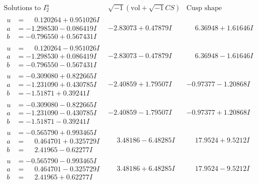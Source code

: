 \documentclass[1p]{elsarticle_modified}
\theoremstyle{definition}
\newcommand{\I}{\sqrt{-1}}
\begin{document}
$$\begin{array}{c|c|c}  
\text{Solutions to }I^u_{2}& \I (\text{vol} + \sqrt{-1}CS) & \text{Cusp shape}\\
 \hline 
\begin{aligned}
u &= \phantom{-}0.120264 + 0.951026 I \\
a &= -1.298530 - 0.086419 I \\
b &= -0.796550 + 0.567431 I\end{aligned}
 & -2.83073 + 0.47879 I & \phantom{-}6.36948 + 1.61646 I \\ \hline\begin{aligned}
u &= \phantom{-}0.120264 - 0.951026 I \\
a &= -1.298530 + 0.086419 I \\
b &= -0.796550 - 0.567431 I\end{aligned}
 & -2.83073 - 0.47879 I & \phantom{-}6.36948 - 1.61646 I \\ \hline\begin{aligned}
u &= -0.309080 + 0.822665 I \\
a &= -1.231090 + 0.430785 I \\
b &= -1.51871 + 0.39241 I\end{aligned}
 & -2.40859 + 1.79507 I & -0.97377 - 1.20868 I \\ \hline\begin{aligned}
u &= -0.309080 - 0.822665 I \\
a &= -1.231090 - 0.430785 I \\
b &= -1.51871 - 0.39241 I\end{aligned}
 & -2.40859 - 1.79507 I & -0.97377 + 1.20868 I \\ \hline\begin{aligned}
u &= -0.565790 + 0.993465 I \\
a &= \phantom{-}0.464701 + 0.325729 I \\
b &= \phantom{-}2.41965 - 0.62277 I\end{aligned}
 & \phantom{-}3.48186 - 6.48285 I & \phantom{-}17.9524 + 9.5212 I \\ \hline\begin{aligned}
u &= -0.565790 - 0.993465 I \\
a &= \phantom{-}0.464701 - 0.325729 I \\
b &= \phantom{-}2.41965 + 0.62277 I\end{aligned}
 & \phantom{-}3.48186 + 6.48285 I & \phantom{-}17.9524 - 9.5212 I \\ \hline\begin{aligned}

\end{aligned}
\end{array}$$
\end{document}

